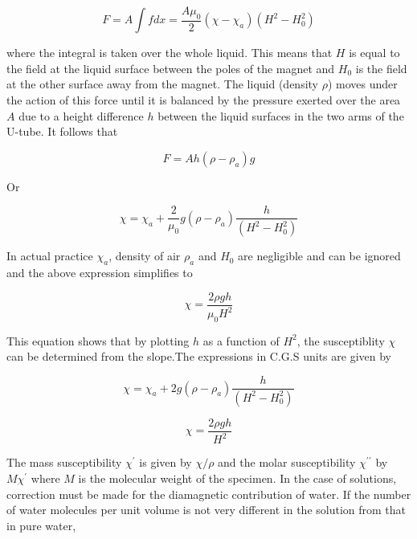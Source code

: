 \documentclass[%
 sor,
 jor,
 amsmath,amssymb,
 reprint,
]{revtex4-2}
\begin{document}
\begin{equation}
    F = A \int f dx = \frac{A \mu_{0}}{2} (\chi - \chi_{a}) (H^{2} - H_{0}^{2})
\end{equation}

where the integral is taken over the whole liquid. This means that $H$ is equal to the field at the liquid surface between the poles of the magnet and $H_{0}$ is the field at the other surface away from the magnet. The liquid (density $\rho$) moves under the action of this force until it is balanced by the pressure exerted over the area $A$ due to a height difference $h$ between the liquid surfaces in the two arms of the U-tube. It follows that

\begin{equation}
    F = A h (\rho - \rho_{a}) g \nonumber
\end{equation}

Or

\begin{equation}
    \chi = \chi_{a} + \frac{2}{\mu_{0}} g (\rho - \rho_{a}) \frac{h}{(H^{2} - H_{0}^{2})}
\end{equation}

In actual practice $\chi_{a}$, density of air $\rho_{a}$ and $H_{0}$ are negligible and can be ignored and the above expression simplifies to

\begin{equation}
    \chi = \frac{2 \rho g h}{\mu_{0} H^{2}}
\end{equation}

This equation shows that by plotting $h$ as a function of $H^2$, the susceptiblity $\chi$ can be determined from the slope.The expressions in C.G.S units are given by

\begin{equation}
    \chi = \chi_a + 2g (\rho - \rho_a)\frac{ h}{( H^{2}- H_0^{2})}
\end{equation}

\begin{equation}
	\boxed{    \chi = \frac{2\rho g h}{ H^{2}}}
\end{equation}

The mass susceptibility $\chi^{\prime}$ is given by $\chi / \rho$ and the molar susceptibility $\chi^{\prime \prime}$ by $M \chi^{\prime}$ where $M$ is the molecular weight of the specimen. In the case of solutions, correction must be made for the diamagnetic contribution of water. If the number of water molecules per unit volume is not very different in the solution from that in pure water,
\end{document}
